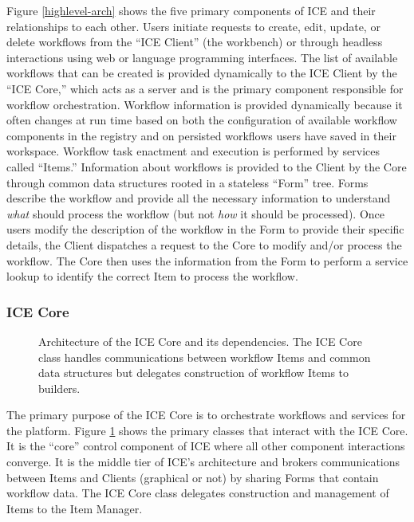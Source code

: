 Figure \ref{highlevel-arch} shows the five primary components of ICE and their
relationships to each other. Users initiate requests to create, edit, update, or
delete workflows from the ``ICE Client'' (the workbench) or through headless
interactions using web or language programming interfaces. The list of available
workflows that can be created is provided dynamically to the ICE Client by the
``ICE Core,'' which acts as a server and is the primary component responsible
for workflow orchestration. Workflow information is provided dynamically because
it often changes at run time based on both the configuration of available
workflow components in the registry and on persisted workflows users have
saved in their workspace. Workflow task enactment and execution is performed by
services called ``Items.'' Information about workflows is provided to the Client
by the Core through common data structures rooted in a stateless ``Form'' tree.
Forms describe the workflow and provide all the necessary information to
understand \emph{what} should process the workflow (but not \emph{how} it should
be processed). Once users modify the description of the workflow in the Form to
provide their specific details, the Client dispatches a request to the Core to
modify and/or process the workflow. The Core then uses the information from the
Form to perform a service lookup to identify the correct Item to process the
workflow.

\subsubsection{ICE Core}

\begin{figure}[htbp]
\centering
{}
\caption{Architecture of the ICE Core and its dependencies. The ICE Core class
handles communications between workflow Items and common data structures but
delegates construction of workflow Items to builders.}
\label{core-arch}
\end{figure}

The primary purpose of the ICE Core is to orchestrate workflows and services for
the platform. Figure \ref{core-arch} shows the primary classes that interact
with the ICE Core. It is the ``core'' control component of ICE where all other
component interactions converge. It is the middle tier of ICE's architecture and
brokers communications between Items and Clients (graphical or not) by sharing
Forms that contain workflow data. The ICE Core class delegates construction and
management of Items to the Item Manager.

